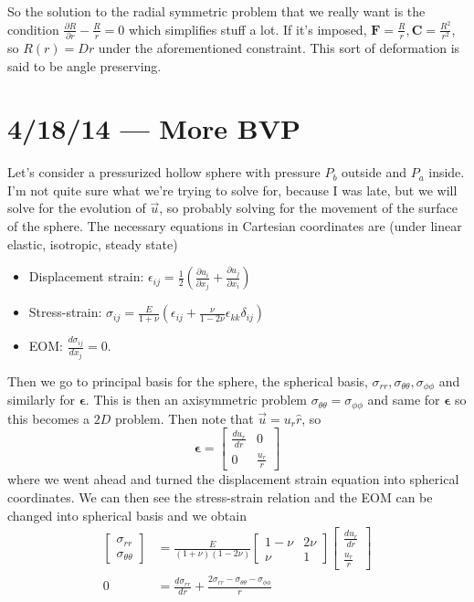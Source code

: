 \documentclass[10pt]{report}
\newcommand{\rd}[2]{\frac{d#1}{d#2}}
\newcommand{\pd}[2]{\frac{\partial #1}{\partial#2}}
\begin{document}
So the solution to the radial symmetric problem that we really want is the condition $\pd{R}{r} - \frac{R}{r} = 0$ which simplifies stuff a lot. If it's imposed, $\mathbf{F} = \frac{R}{r}, \mathbf{C} = \frac{R^2}{r^2}$, so $R(r) = Dr$ under the aforementioned constraint. This sort of deformation is said to be angle preserving.

\chapter{4/18/14 --- More BVP}

Let's consider a pressurized hollow sphere with pressure $P_b$ outside and $P_a$ inside. I'm not quite sure what we're trying to solve for, because I was late, but we will solve for the evolution of $\vec{u}$, so probably solving for the movement of the surface of the sphere. The necessary equations in Cartesian coordinates are (under linear elastic, isotropic, steady state)
\begin{itemize}
    \item Displacement strain: $\epsilon_{ij} = \frac{1}{2}\left( \pd{u_i}{x_j} + \pd{u_j}{x_i} \right)$
    \item Stress-strain: $\sigma_{ij} = \frac{E}{1 + \nu}\left( \epsilon_{ij} + \frac{\nu}{1 - 2\nu}\epsilon_{kk}\delta_{ij} \right)$\\
    \item EOM: $\rd{\sigma_{ij}}{x_j} = 0$. 
\end{itemize}

Then we go to principal basis for the sphere, the spherical basis, $\sigma_{rr}, \sigma_{\theta\theta}, \sigma_{\phi\phi}$ and similarly for $\mathbf{\epsilon}$. This is then an axisymmetric problem $\sigma_{\theta\theta} = \sigma_{\phi\phi}$ and same for $\mathbf{\epsilon}$ so this becomes a $2D$ problem. Then note that $\vec{u} = u_r\hat{r}$, so
\begin{equation}
    \mathbf{\epsilon} = \begin{bmatrix} \rd{u_r}{r} & 0\\0 & \frac{u_r}{r} \end{bmatrix} \label{4.18.strain}
\end{equation}
where we went ahead and turned the displacement strain equation into spherical coordinates. We can then see the stress-strain relation and the EOM can be changed into spherical basis and we obtain
\begin{align}
    \begin{bmatrix} \sigma_{rr}\\ \sigma_{\theta\theta} \end{bmatrix} &= \frac{E}{(1+\nu)(1-2\nu)}\begin{bmatrix} 1 - \nu & 2\nu\\ \nu & 1 \end{bmatrix} \begin{bmatrix} \rd{u_r}{r} \\ \frac{u_r}{r} \end{bmatrix} \label{4.18.stress}\\
    0 &= \rd{\sigma_{rr}}{r} + \frac{2\sigma_{rr} - \sigma_{\theta\theta} - \sigma_{\phi\phi}}{r}
\end{align}
\end{document}
